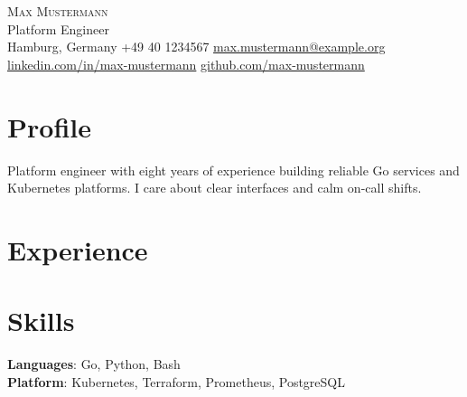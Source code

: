 \documentclass[letterpaper,11pt]{article}
\begin{document}



\begin{center}
  {\Huge \scshape Max Mustermann} \\ \vspace{2pt}
  \small Platform Engineer \\ \vspace{3pt}
   Hamburg, Germany \quad
   +49 40 1234567 \quad
  \href{mailto:max.mustermann@example.org}{ max.mustermann@example.org} \quad
  \href{https://linkedin.com/in/max-mustermann}{ linkedin.com/in/max-mustermann} \quad
  \href{https://github.com/max-mustermann}{ github.com/max-mustermann}
\end{center}

\section{Profile}
\small{Platform engineer with eight years of experience building reliable Go services and Kubernetes platforms. I care about clear interfaces and calm on-call shifts.}

\section{Experience}
\resumeSubHeadingListStart
  \resumeItemListStart
  \resumeItemListEnd
  \resumeItemListStart
  \resumeItemListEnd
\resumeSubHeadingListEnd

\section{Skills}
\begin{itemize}[leftmargin=0.15in, label={}]
  \small{\item{
    \textbf{Languages}{: Go, Python, Bash} \\
    \textbf{Platform}{: Kubernetes, Terraform, Prometheus, PostgreSQL}
  }}
\end{itemize}
\end{document}
